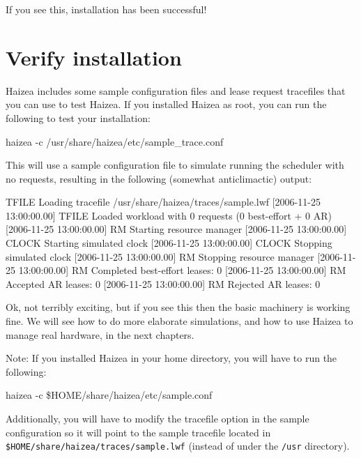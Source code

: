 If you see this, installation has been successful!

\section{Verify installation}

Haizea includes some sample configuration files and lease request tracefiles that you can use to test Haizea. If you installed Haizea as root, you can run the following to test your installation:

\begin{shellverbatim}
haizea -c /usr/share/haizea/etc/sample_trace.conf
\end{shellverbatim}

This will use a sample configuration file to simulate running the scheduler with no requests, resulting in the following (somewhat anticlimactic) output:

\begin{wideshellverbatim}
[2006-11-25 13:00:00.00] TFILE   Loading tracefile /usr/share/haizea/traces/sample.lwf
[2006-11-25 13:00:00.00] TFILE   Loaded workload with 0 requests (0 best-effort + 0 AR)
[2006-11-25 13:00:00.00] RM      Starting resource manager
[2006-11-25 13:00:00.00] CLOCK   Starting simulated clock
[2006-11-25 13:00:00.00] CLOCK   Stopping simulated clock
[2006-11-25 13:00:00.00] RM      Stopping resource manager
[2006-11-25 13:00:00.00] RM        Completed best-effort leases: 0
[2006-11-25 13:00:00.00] RM        Accepted AR leases: 0
[2006-11-25 13:00:00.00] RM        Rejected AR leases: 0
\end{wideshellverbatim}

Ok, not terribly exciting, but if you see this then the basic machinery is working fine. We will see how to do more elaborate simulations, and how to use Haizea to manage real hardware, in the next chapters.

Note: If you installed Haizea in your home directory, you will have to run the following:

\begin{shellverbatim}
haizea -c \$HOME/share/haizea/etc/sample.conf
\end{shellverbatim}

Additionally, you will have to modify the tracefile option in the sample configuration so it will point to the sample tracefile located in \texttt{\$HOME/share/haizea/traces/sample.lwf} (instead of under the \texttt{/usr} directory).